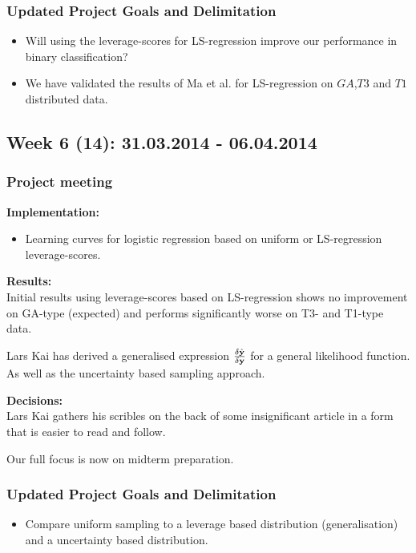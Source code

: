 \documentclass[11pt, a4paper]{article} %
\begin{document}
\subsubsection*{Updated Project Goals and Delimitation}
\begin{itemize}
\item Will using the leverage-scores for LS-regression improve our performance in binary classification?
\item We have validated the results of Ma et al. for LS-regression on $GA$,$T3$ and $T1$ distributed data.
\end{itemize}
\subsection*{Week 6 (14): 31.03.2014 - 06.04.2014}
\subsubsection*{Project meeting}

\textbf{Implementation:}\\
\begin{itemize}
\item Learning curves for logistic regression based on uniform or LS-regression leverage-scores.
\end{itemize}

\textbf{Results:}\\
Initial results using leverage-scores based on LS-regression shows no improvement on GA-type (expected) and performs significantly worse on T3- and T1-type data.

Lars Kai has derived a generalised expression $\frac{\delta \hat{{\bf y}}}{\delta {\bf y}}$ for a general likelihood function. As well as the uncertainty based sampling approach.

\textbf{Decisions:}\\
Lars Kai gathers his scribles on the back of some insignificant article in a form that is easier to read and follow.

Our full focus is now on midterm preparation.

\subsubsection*{Updated Project Goals and Delimitation}
\begin{itemize}
\item Compare uniform sampling to a leverage based distribution (generalisation) and a uncertainty based distribution.
\end{itemize}
\end{document}
